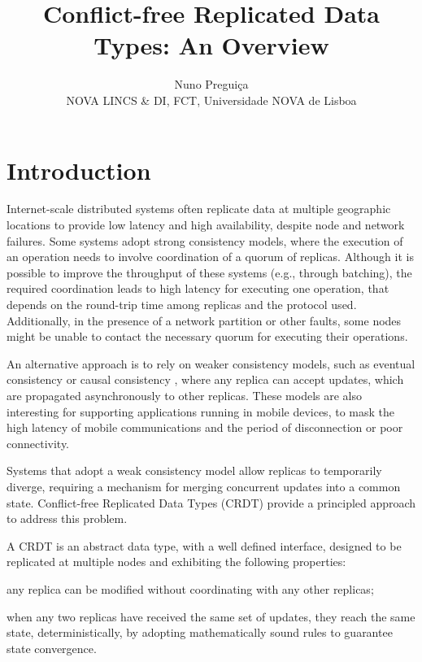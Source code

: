 \documentclass[11pt,a4paper]{article}
\begin{document}
\date{}

\title{Conflict-free Replicated Data Types: An Overview
}
\author{Nuno Preguiça\\
NOVA LINCS \& DI, FCT, Universidade NOVA de Lisboa}
\maketitle

\section{Introduction}

Internet-scale distributed systems often replicate data at multiple geographic locations
to provide low latency and high availability, despite node and network failures. 
Some systems \cite{spanner,replicatedcommit,farm,mdcc,Zhang13Transaction,blotter} adopt strong consistency models,
where the execution of an operation needs to involve coordination of a quorum of replicas.
Although it is possible to improve the throughput of these systems
(e.g., through batching), the required coordination leads to high latency for executing one operation,
that depends on the round-trip time among replicas and the protocol used.
Additionally, in the presence of a network partition or other faults, some nodes
might be unable to contact the necessary quorum for executing their operations.

An alternative approach is to rely on weaker consistency models, such as 
eventual consistency \cite{dynamo,lotusnotes,cassandra} or causal 
consistency \cite{cops,chainreaction,swiftcloud}, where any replica can 
accept updates, which are propagated asynchronously to other replicas. 
These models are also interesting for supporting applications running in mobile devices, 
to mask the high latency of mobile communications and the period of disconnection or poor
connectivity.

Systems that adopt a weak consistency model allow replicas to temporarily diverge, 
requiring a mechanism for merging concurrent updates into a common state. 
Conflict-free Replicated Data Types (CRDT) provide a principled approach to address this problem.

A CRDT is an abstract data type, with a well defined interface,
designed to be replicated at multiple nodes and exhibiting the following properties:
\begin{inparaenum}[(i)]
\item any replica can be modified without coordinating with any other replicas;
\item when any two replicas have received the same set of updates, 
they reach the same state, deterministically, 
by adopting mathematically sound rules to guarantee state convergence. 
\end{inparaenum}
\end{document}
